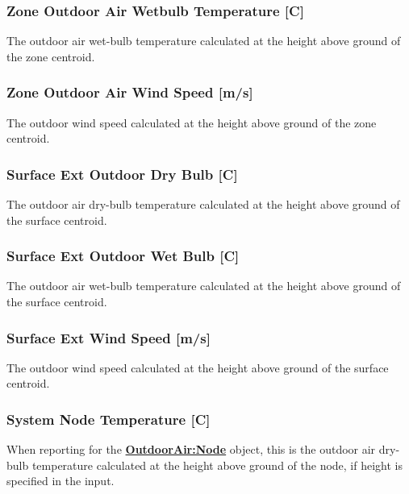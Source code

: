 \subsubsection{Zone Outdoor Air Wetbulb Temperature {[}C{]}}\label{zone-outdoor-air-wetbulb-temperature-c}

The outdoor air wet-bulb temperature calculated at the height above ground of the zone centroid.

\subsubsection{Zone Outdoor Air Wind Speed {[}m/s{]}}\label{zone-outdoor-air-wind-speed-ms}

The outdoor wind speed calculated at the height above ground of the zone centroid.

\subsubsection{Surface Ext Outdoor Dry Bulb {[}C{]}}\label{surface-ext-outdoor-dry-bulb-c}

The outdoor air dry-bulb temperature calculated at the height above ground of the surface centroid.

\subsubsection{Surface Ext Outdoor Wet Bulb {[}C{]}}\label{surface-ext-outdoor-wet-bulb-c}

The outdoor air wet-bulb temperature calculated at the height above ground of the surface centroid.

\subsubsection{Surface Ext Wind Speed {[}m/s{]}}\label{surface-ext-wind-speed-ms}

The outdoor wind speed calculated at the height above ground of the surface centroid.

\subsubsection{System Node Temperature {[}C{]}}\label{system-node-temperature-c}

When reporting for the \textbf{\hyperref[outdoorairnode]{OutdoorAir:Node}} object, this is the outdoor air dry-bulb temperature calculated at the height above ground of the node, if height is specified in the input.
